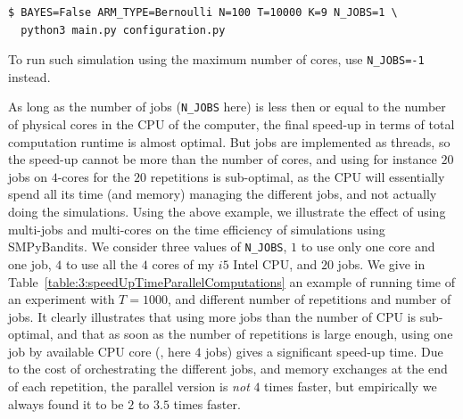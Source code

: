 \begin{small}
    \begin{listing}[h!]
        \begin{verbatim}
$ BAYES=False ARM_TYPE=Bernoulli N=100 T=10000 K=9 N_JOBS=1 \
  python3 main.py configuration.py
        \end{verbatim}
        \caption{To run such simulation using the maximum number of cores, use \texttt{N\_JOBS=-1} instead.}
        \label{lst:3:runOneCoreOrMore}
    \end{listing}
\end{small}

As long as the number of jobs (\texttt{N\_JOBS} here) is less then or equal to the number of physical cores in the CPU of the computer, the final speed-up in terms of total computation runtime is almost optimal.
But jobs are implemented as threads, so the speed-up cannot be more than the number of cores, and using for instance $20$ jobs on $4$-cores for the $20$ repetitions is sub-optimal, as the CPU will essentially spend all its time (and memory) managing the different jobs, and not actually doing the simulations.
Using the above example, we illustrate the effect of using multi-jobs and multi-cores on the time efficiency of simulations using SMPyBandits. We consider three values of \texttt{N\_JOBS}, $1$ to use only one core and one job, $4$ to use all the $4$ cores of my $i5$ Intel CPU, and $20$ jobs.
We give in Table~\ref{table:3:speedUpTimeParallelComputations} an example of running time of an experiment with $T=1000$, and different number of repetitions and number of jobs.
It clearly illustrates that using more jobs than the number of CPU is sub-optimal, and that as soon as the number of repetitions is large enough, using one job by available CPU core (\ie, here $4$ jobs) gives a significant speed-up time.
Due to the cost of orchestrating the different jobs, and memory exchanges at the end of each repetition, the parallel version is \emph{not} $4$ times faster, but empirically we always found it to be $2$ to $3.5$ times faster.


